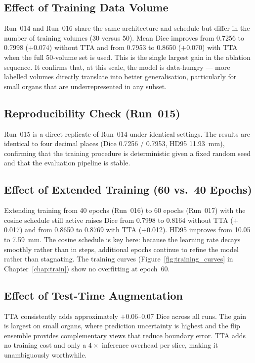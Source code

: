 \FloatBarrier

\subsection{Effect of Training Data Volume}

Run~014 and Run~016 share the same architecture and schedule but differ in the number of training volumes (30 versus 50). Mean Dice improves from 0.7256 to 0.7998 ($+$0.074) without TTA and from 0.7953 to 0.8650 ($+$0.070) with TTA when the full 50-volume set is used. This is the single largest gain in the ablation sequence. It confirms that, at this scale, the model is data-hungry --- more labelled volumes directly translate into better generalisation, particularly for small organs that are underrepresented in any subset.

\subsection{Reproducibility Check (Run~015)}

Run~015 is a direct replicate of Run~014 under identical settings. The results are identical to four decimal places (Dice 0.7256 / 0.7953, HD95 11.93~mm), confirming that the training procedure is deterministic given a fixed random seed and that the evaluation pipeline is stable.

\subsection{Effect of Extended Training (60 vs.\ 40 Epochs)}

Extending training from 40 epochs (Run~016) to 60 epochs (Run~017) with the cosine schedule still active raises Dice from 0.7998 to 0.8164 without TTA ($+$0.017) and from 0.8650 to 0.8769 with TTA ($+$0.012). HD95 improves from 10.05 to 7.59~mm. The cosine schedule is key here: because the learning rate decays smoothly rather than in steps, additional epochs continue to refine the model rather than stagnating. The training curves (Figure~\ref{fig:training_curves} in Chapter~\ref{chap:train}) show no overfitting at epoch~60.

\subsection{Effect of Test-Time Augmentation}

TTA consistently adds approximately $+$0.06--0.07 Dice across all runs. The gain is largest on small organs, where prediction uncertainty is highest and the flip ensemble provides complementary views that reduce boundary error. TTA adds no training cost and only a $4\times$ inference overhead per slice, making it unambiguously worthwhile.

